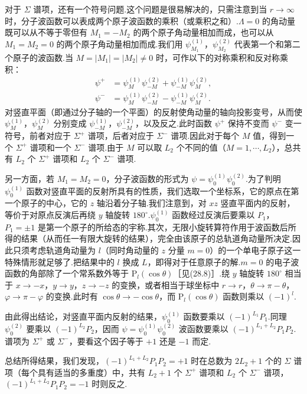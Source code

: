 对于 $\Sigma$ 谱项，还有一个符号问题.这个问题是很易解决的，只需注意到当 $r\to\infty$ 时，分子波函数可以表成两个原子波函数的乘积（或乘积之和）.$\Lambda=0$ 的角动量既可以从不等于零但有 $M_1=-M_2$ 的两个原子角动量相加而成，也可以从 $M_1=M_2=0$ 的两个原子角动量相加而成.我们用 $\psi_{M_1}^{(1)}$，$\psi_{M_2}^{(2)}$ 代表第一个和第二个原子的波函数.当 $M=|M_1|=|M_2|\neq0$ 时，可作以下的对称乘积和反对称乘积：
\begin{equation*}
\begin{aligned}
  \psi^+&=\psi_M^{(1)}\psi_{-M}^{(2)}+\psi_{-M}^{(1)}\psi_M^{(2)},\\
  \psi^-&=\psi_M^{(1)}\psi_{-M}^{(2)}-\psi_{-M}^{(1)}\psi_M^{(2)}.
\end{aligned}
\end{equation*}
对竖直平面（即通过分子轴的一个平面）的反射使角动量的轴向投影变号，从而使 $\psi_M^{(1)}$，$\psi_M^{(2)}$ 分别变成 $\psi_{-M}^{(1)}$，$\psi_{-M}^{(2)}$，以及反之.此时函数 $\psi^+$ 保持不变而 $\psi^-$ 变一符号，前者对应于 $\Sigma^+$ 谱项，后者对应于 $\Sigma^-$ 谱项.因此对于每个 $M$ 值，得到一个 $\Sigma^+$ 谱项和一个 $\Sigma^-$ 谱项.由于 $M$ 可以取 $L_2$ 个不同的值（$M=1,\cdots,L_2$），总共有 $L_2$ 个 $\Sigma^+$ 谱项和 $L_2$ 个 $\Sigma^-$ 谱项.

另一方面，若 $M_1=M_2=0$，分子波函数的形式为 $\psi=\psi_0^{(1)}\psi_0^{(2)}$.为了判明 $\psi_0^{(1)}$ 函数对竖直平面的反射所具有的性质，我们选取一个坐标系，它的原点在第一个原子的中心，它的 $z$ 轴沿着分子轴.我们注意到，对 $xz$ 竖直平面内的反射，等价于对原点反演后再绕 $y$ 轴旋转 $180^\circ$.$\psi_0^{(1)}$ 函数经过反演后要乘以 $P_1$，$P_1=\pm1$ 是第一个原子的所给态的宇称.其次，无限小旋转算符作用于波函数后所得的结果（从而任一有限大旋转的结果），完全由该原子的总轨道角动量所决定.因此只须考虑轨道角动量为 $l$（同时角动量的 $z$ 分量 $m=0$）的一个单电子原子这一特殊情形就足够了.把结果中的 $l$ 换成 $L$，即得对于任意原子的解.$m=0$ 的电子波函数的角部除了一个常系数外等于 $\mathrm{P}_l(\cos\theta)$［见(28.8)］.绕 $y$ 轴旋转 $180^\circ$ 相当于 $x\to-x$，$y\to y$，$z\to-z$ 的变换，或者相当于球坐标中 $r\to r$，$\theta\to\pi-\theta$，$\varphi\to\pi-\varphi$ 的变换.此时有 $\cos\theta\to-\cos\theta$，而 $\mathrm{P}_l(\cos\theta)$ 函数则乘以 $(-1)^l$.

由此得出结论，对竖直平面内反射的结果，$\psi_0^{(1)}$ 函数要乘以 $(-1)^{L_1}P_1$.同理 $\psi_0^{(2)}$ 要乘以 $(-1)^{L_2}P_2$，因而 $\psi=\psi_0^{(1)}\psi_0^{(2)}$ 波函数要乘以 $(-1)^{L_1+L_2}P_1P_2$.谱项为 $\Sigma^+$ 或 $\Sigma^-$，要看这个因子等于 $+1$ 还是 $-1$ 而定.

总结所得结果，我们发现，$(-1)^{L_1+L_2}P_1P_2=+1$ 时在总数为 $2L_2+1$ 个的 $\Sigma$ 谱项（每个具有适当的多重度）中，共有 $L_2+1$ 个 $\Sigma^+$ 谱项和 $L_2$ 个 $\Sigma^-$ 谱项，$(-1)^{L_1+L_2}P_1P_2=-1$ 时则反之.

